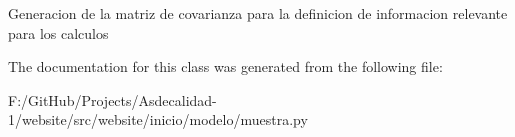 \begin{DoxyVerb}Generacion de la matriz de covarianza para la definicion de informacion
relevante para los calculos
\end{DoxyVerb}
 

The documentation for this class was generated from the following file\+:\begin{DoxyCompactItemize}
\item 
F\+:/\+Git\+Hub/\+Projects/\+Asdecalidad-\/1/website/src/website/inicio/modelo/muestra.\+py\end{DoxyCompactItemize}
